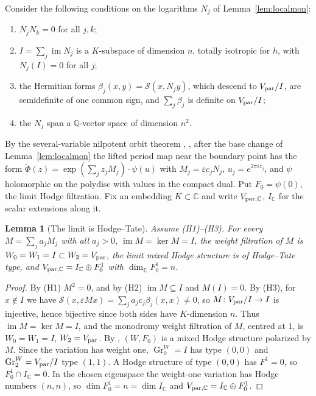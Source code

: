 \documentclass[11pt]{amsart}
\newtheorem{lemma}[theorem]{Lemma}
\theoremstyle{definition}
\theoremstyle{remark}
\newcommand{\Q}{\mathbb Q}
\newcommand{\C}{\mathbb C}
\newcommand{\Vp}{V_{\rm par}}
\newcommand{\VpC}{V_{{\rm par},\C}}
\begin{document}
Consider the following conditions on the logarithms $N_j$ of Lemma~\ref{lem:localmon}:
\begin{enumerate}
\item[(H1)] $N_jN_k=0$ for all $j,k$;
\item[(H2)] $I=\sum_j\operatorname{im}N_j$ is a $K$-subspace of dimension $n$, totally isotropic for $h$, with $N_j(I)=0$ for all $j$;
\item[(H3)] the Hermitian forms $\beta_j(x,y)=\mathcal S(x,N_jy)$, which descend to $\Vp/I$, are semidefinite of one common sign, and $\sum_j\beta_j$ is definite on $\Vp/I$;
\item[(H4)] the $N_j$ span a $\Q$-vector space of dimension $n^2$.
\end{enumerate}
By the several-variable nilpotent orbit theorem \cite[(4.12)]{Schmid}, \cite[(1.15)]{CKS}, after the base change of Lemma~\ref{lem:localmon} the lifted period map near the boundary point has the form $\tilde\Phi(z)=\exp(\sum_jz_jM_j)\cdot\psi(u)$ with $M_j=\varepsilon c_jN_j$, $u_j=e^{2\pi iz_j}$, and $\psi$ holomorphic on the polydisc with values in the compact dual. Put $F_0=\psi(0)$, the limit Hodge filtration. Fix an embedding $K\subset\C$ and write $\VpC$, $I_\C$ for the scalar extensions along it.

\begin{lemma}[The limit is Hodge--Tate]\label{lem:hodgetate}
Assume (H1)--(H3). For every $M=\sum_ja_jM_j$ with all $a_j>0$, $\operatorname{im}M=\ker M=I$, the weight filtration of $M$ is $W_0=W_1=I\subset W_2=\Vp$, the limit mixed Hodge structure is of Hodge--Tate type, and $\VpC=I_\C\oplus F^1_0$ with $\dim_\C F^1_0=n$.
\end{lemma}

\begin{proof}
By (H1) $M^2=0$, and by (H2) $\operatorname{im}M\subseteq I$ and $M(I)=0$. By (H3), for $x\notin I$ we have $\mathcal S(x,\varepsilon Mx)=\sum_ja_jc_j\beta_j(x,x)\ne0$, so $M\colon \Vp/I\to I$ is injective, hence bijective since both sides have $K$-dimension $n$. Thus $\operatorname{im}M=\ker M=I$, and the monodromy weight filtration of $M$, centred at $1$, is $W_0=W_1=I$, $W_2=\Vp$. By \cite[(4.5)]{CKS}, $(W,F_0)$ is a mixed Hodge structure polarized by $M$. Since the variation has weight one, $\operatorname{Gr}^W_0=I$ has type $(0,0)$ and $\operatorname{Gr}^W_2=\Vp/I$ type $(1,1)$. A Hodge structure of type $(0,0)$ has $F^1=0$, so $F^1_0\cap I_\C=0$. In the chosen eigenspace the weight-one variation has Hodge numbers $(n,n)$, so $\dim F^1_0=n=\dim I_\C$ and $\VpC=I_\C\oplus F^1_0$.
\end{proof}
\end{document}
